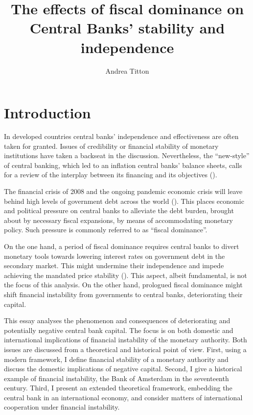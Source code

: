 \documentclass[american]{scrartcl}
\title{The effects of fiscal dominance on Central Banks' stability and independence}
\author{Andrea Titton}
\begin{document}
\clearpage
\thispagestyle{empty}
\maketitle
\clearpage



\section{Introduction}

In developed countries central banks' independence and effectiveness are often taken for granted. Issues of credibility or financial stability of monetary institutions have taken a backseat in the discussion. Nevertheless, the ``new-style'' of central banking, which led to an inflation central banks' balance sheets, calls for a review of the interplay between its financing and its objectives (\cite{Hall2015}).

The financial crisis of 2008 and the ongoing pandemic economic crisis will leave behind high levels of government debt across the world (\cite{WEO2020}). This places economic and political pressure on central banks to alleviate the debt burden, brought about by necessary fiscal expansions, by means of accommodating monetary policy. Such pressure is commonly referred to as ``fiscal dominance''.

On the one hand, a period of fiscal dominance requires central banks to divert monetary tools towards lowering interest rates on government debt in the secondary market. This might undermine their independence and impede achieving the mandated price stability (\cite{FernandezAlbertos2015}). This aspect, albeit fundamental, is not the focus of this analysis. On the other hand, prologued fiscal dominance might shift financial instability from governments to central banks, deteriorating their capital.

This essay analyses the phenomenon and consequences of deteriorating and potentially negative central bank capital. The focus is on both domestic and international implications of financial instability of the monetary authority. Both issues are discussed from a theoretical and historical point of view. First, using a modern framework, I define financial stability of a monetary authority and discuss the domestic implications of negative capital. Second, I give a historical example of financial instability, the Bank of Amsterdam in the seventeenth century. Third, I present an extended theoretical framework, embedding the central bank in an international economy, and consider matters of international cooperation under financial instability. %
\end{document}
